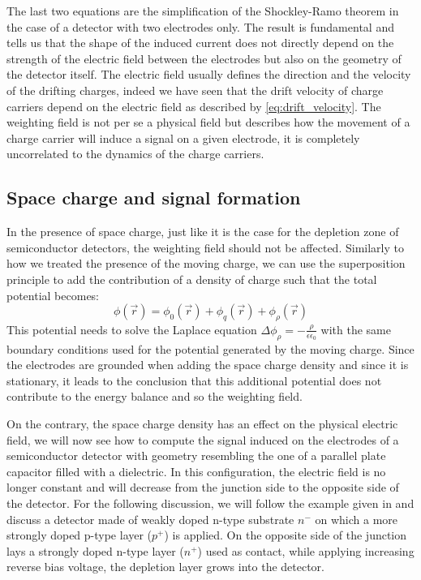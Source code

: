 		The last two equations are the simplification of the Shockley-Ramo theorem in the case of a detector with two electrodes only. The result is fundamental and tells us that the shape of the induced current does not directly depend on the strength of the electric field between the electrodes but also on the geometry of the detector itself. The electric field usually defines the direction and the velocity of the drifting charges, indeed we have seen that the drift velocity of charge carriers depend on the electric field as described by \eqref{eq:drift_velocity}. The weighting field is not per se a physical field but describes how the movement of a charge carrier will induce a signal on a given electrode, it is completely uncorrelated to the dynamics of the charge carriers. 
		\clearpage
		\subsection{Space charge and signal formation}\label{subsec:2.2.3}

		In the presence of space charge, just like it is the case for the depletion zone of semiconductor detectors, the weighting field should not be affected. Similarly to how we treated the presence of the moving charge, we can use the superposition principle to add the contribution of a density of charge such that the total potential becomes: 
		\begin{equation}
			\phi(\vec{r}) = \phi_0(\vec{r}) + \phi_q(\vec{r}) + \phi_\rho(\vec{r})
		\end{equation}
		This potential needs to solve the Laplace equation $\Delta \phi_\rho = -\frac{\rho}{\epsilon \epsilon_0}$ with the same boundary conditions used for the potential generated by the moving charge. Since the electrodes are grounded when adding the space charge density and since it is stationary, it leads to the conclusion that this additional potential does not contribute to the energy balance and so the weighting field. 

		On the contrary, the space charge density has an effect on the physical electric field, we will now see how to compute the signal induced on the electrodes of a semiconductor detector with geometry resembling the one of a parallel plate capacitor filled with a dielectric. In this configuration, the electric field is no longer constant and will decrease from the junction side to the opposite side of the detector. For the following discussion, we will follow the example given in \cite{detectors} and discuss a detector made of weakly doped n-type substrate $n^-$ on which a more strongly doped p-type layer ($p^+$) is applied. On the opposite side of the junction lays a strongly doped n-type layer ($n^+$) used as contact, while applying increasing reverse bias voltage, the depletion layer grows into the detector.


